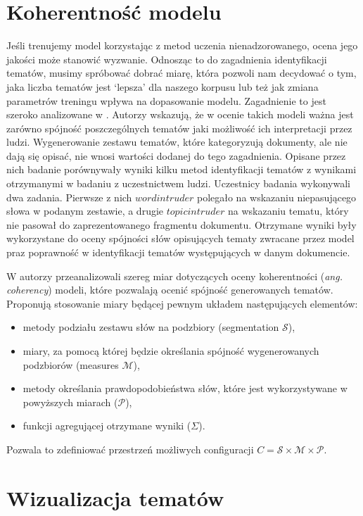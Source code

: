\documentclass[a4paper,11pt,twoside]{report}
\theoremstyle{definition}
\begin{document}
\section{Koherentność modelu}\label{section:ldacoh}
Jeśli trenujemy model korzystając z metod uczenia nienadzorowanego, ocena jego jakości może stanowić wyzwanie. Odnosząc to do zagadnienia identyfikacji tematów, musimy spróbować dobrać miarę, która pozwoli nam decydować o tym, jaka liczba tematów jest ‘lepsza’ dla naszego korpusu lub też jak zmiana parametrów treningu wpływa na dopasowanie modelu. Zagadnienie to jest szeroko analizowane w \cite{RTL}. Autorzy wskazują, że w ocenie takich modeli ważna jest zarówno spójność poszczególnych tematów jaki możliwość ich interpretacji przez ludzi. Wygenerowanie zestawu tematów, które kategoryzują dokumenty, ale nie dają się opisać, nie wnosi wartości dodanej do tego zagadnienia. Opisane przez nich badanie porównywały wyniki kilku metod identyfikacji tematów z wynikami otrzymanymi w badaniu z uczestnictwem ludzi. Uczestnicy badania wykonywali dwa zadania. Pierwsze z nich $word intruder$ polegało na wskazaniu niepasującego słowa w podanym zestawie, a drugie $topic intruder$ na wskazaniu tematu, który nie pasował do zaprezentowanego fragmentu dokumentu. Otrzymane wyniki były wykorzystane do oceny spójności słów opisujących tematy zwracane przez model praz poprawność w identyfikacji tematów występujących w danym dokumencie. 

W \cite{COH} autorzy przeanalizowali szereg miar dotyczących oceny koherentności (\textit{ang. coherency}) modeli, które pozwalają ocenić spójność generowanych tematów. Proponują stosowanie miary będącej pewnym układem następujących elementów: \begin{itemize}
\item metody podziału zestawu słów na podzbiory (segmentation $\mathcal{S}$),
\item miary, za pomocą której będzie określania spójność wygenerowanych podzbiorów (measures $\mathcal{M}$),
\item metody określania prawdopodobieństwa słów, które jest wykorzystywane w powyższych miarach ($\mathcal{P}$),
\item funkcji agregującej otrzymane wyniki ($\Sigma$).
\end{itemize}
Pozwala to zdefiniować przestrzeń możliwych configuracji $ C = \mathcal{S} \times \mathcal{M} \times \mathcal{P}$.

\section{Wizualizacja tematów}\label{section:ldavis}
\end{document}
